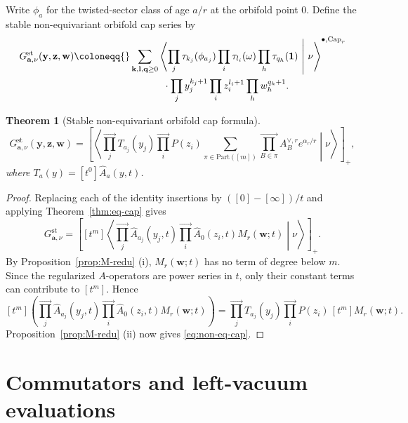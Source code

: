\documentclass[letterpaper,12pt]{amsart}
\newtheorem{thm}{Theorem}[section]
\theoremstyle{definition}
\newcommand{\id}{\mathbf 1}
\newcommand{\Part}{\mathrm{Part}}
\newcommand{\OrbCap}{\mathrm{Cap}}
\numberwithin{equation}{section}
\begin{document}
Write \(\phi_a\) for the twisted-sector class of age \(a/r\) at the
orbifold point \(0\).  Define the stable non-equivariant orbifold cap series by
\begin{align*}
  G^{\mathrm{st}}_{\mathbf a,\nu}(\mathbf y,\mathbf z,\mathbf w)
  \coloneqq{}&
  \sum_{\mathbf k,\mathbf l,\mathbf q\geq0}
  \left\langle
    \prod_j\tau_{k_j}(\phi_{a_j})
    \prod_i\tau_{l_i}(\omega)
    \prod_h\tau_{q_h}(\id)
  \ \middle|\ \nu
  \right\rangle^{\bullet,\OrbCap_r}\\
 &\hspace{12mm}\cdot
  \prod_jy_j^{k_j+1}
  \prod_i z_i^{l_i+1}
  \prod_h w_h^{q_h+1}.
\end{align*}
\begin{thm}[Stable non-equivariant orbifold cap formula]\label{thm:noneq-cap}
\begin{equation}\label{eq:non-eq-cap}
  G^{\mathrm{st}}_{\mathbf a,\nu}(\mathbf y,\mathbf z,\mathbf w)
  =
  \left[
    \left\langle
      \overrightarrow{\prod_j} T_{a_j}(y_j)
      \overrightarrow{\prod_i} P(z_i)
      \sum_{\pi\in\Part([m])}
      \overrightarrow{\prod_{B\in\pi}}A_B^{\vee,r}
      e^{\alpha_r/r}
    \middle|\nu\right\rangle
  \right]_{+},
\end{equation}
where \(T_a(y)=[t^0]\widehat A_a(y,t)\).
\end{thm}

\begin{proof}
Replacing each of the identity insertions by
\(([0]-[\infty])/t\) and applying Theorem~\ref{thm:eq-cap} gives
\[
  G^{\mathrm{st}}_{\mathbf a,\nu}
  =
  \left[
    [t^m]
    \left\langle
      \overrightarrow{\prod_j}\widehat A_{a_j}(y_j,t)
      \overrightarrow{\prod_i}\widehat A_0(z_i,t)
      M_r(\mathbf w;t)
    \middle|\nu\right\rangle
  \right]_{+}.
\]
By Proposition~\ref{prop:M-redu} (i), \(M_r(\mathbf w;t)\) has no term of
degree below \(m\).  Since the regularized \(A\)-operators are power series
in \(t\), only their constant terms can contribute to \([t^m]\).  Hence
\[
  [t^m]\left(
    \overrightarrow{\prod_j}\widehat A_{a_j}(y_j,t)
    \overrightarrow{\prod_i}\widehat A_0(z_i,t)
    M_r(\mathbf w;t)
  \right)
  =
  \overrightarrow{\prod_j}T_{a_j}(y_j)
  \overrightarrow{\prod_i}P(z_i)\,[t^m]M_r(\mathbf w;t).
\]
Proposition~\ref{prop:M-redu} (ii) now gives
\eqref{eq:non-eq-cap}.
\end{proof}


\section{Commutators and left-vacuum evaluations}\label{sec:comm-vac}
\end{document}
